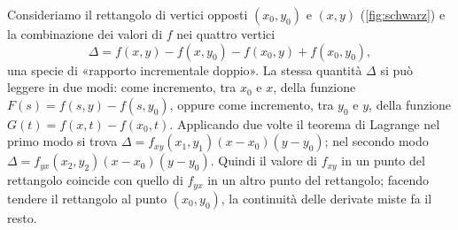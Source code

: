 \begin{strategia}
Consideriamo il rettangolo di vertici opposti $(x_{0},y_{0})$ e $(x,y)$
(\cref{fig:schwarz}) e la combinazione dei valori di $f$ nei quattro vertici
\[
  \Delta=f(x,y)-f(x,y_{0})-f(x_{0},y)+f(x_{0},y_{0}),
\]
una specie di «rapporto incrementale doppio». La stessa quantità $\Delta$ si può leggere
in due modi: come incremento, tra $x_{0}$ e $x$, della funzione $F(s)=f(s,y)-f(s,y_{0})$,
oppure come incremento, tra $y_{0}$ e $y$, della funzione $G(t)=f(x,t)-f(x_{0},t)$. Applicando
due volte il teorema di Lagrange nel primo modo si trova
$\Delta=f_{xy}(x_{1},y_{1})(x-x_{0})(y-y_{0})$; nel secondo modo
$\Delta=f_{yx}(x_{2},y_{2})(x-x_{0})(y-y_{0})$. Quindi il valore di $f_{xy}$ in un punto del
rettangolo coincide con quello di $f_{yx}$ in un altro punto del rettangolo; facendo tendere il rettangolo al punto
$(x_{0},y_{0})$, la continuità delle derivate miste fa il resto.
\end{strategia}

